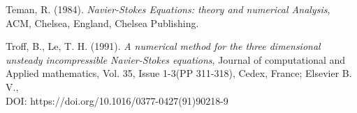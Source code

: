 \documentclass[11pt]{report}
\begin{document}
\begin{description}
		\item Teman, R. (1984). \emph{Navier-Stokes Equations: theory and numerical Analysis}, ACM, Chelsea, England, Chelsea Publishing.
		
		\item Troff, B., Le, T. H. (1991). \emph{A numerical method for the three dimensional unsteady incompressible Navier-Stokes equations}, Journal of computational and Applied mathematics, Vol. 35, Issue 1-3(PP 311-318), Cedex, France; Elsevier B. V., \\DOI: https://doi.org/10.1016/0377-0427(91)90218-9
	\end{description}
	
\end{document}

